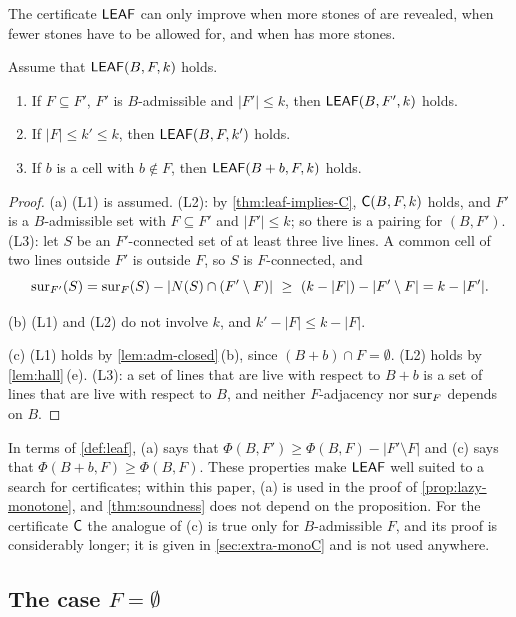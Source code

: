 The certificate $\mathsf{LEAF}$ can only improve when more stones of \Maker{} are revealed, when fewer stones
have to be allowed for, and when \Breaker{} has more stones.

\begin{proposition}\label{prop:leaf-monotone}
Assume that $\mathsf{LEAF}(B,F,k)$ holds.
\begin{enumerate}[label=\textup{(\alph*)}]
\item If $F\subseteq F'$, $F'$ is $B$-admissible and $|F'|\le k$, then $\mathsf{LEAF}(B,F',k)$ holds.
\item If $|F|\le k'\le k$, then $\mathsf{LEAF}(B,F,k')$ holds.
\item If $b$ is a cell with $b\notin F$, then $\mathsf{LEAF}(B+b,F,k)$ holds.
\end{enumerate}
\end{proposition}

\begin{proof}
(a) (L1) is assumed. (L2): by \cref{thm:leaf-implies-C}, $\mathsf{C}(B,F,k)$ holds, and $F'$ is a $B$-admissible
set with $F\subseteq F'$ and $|F'|\le k$; so there is a pairing for $(B,F')$. (L3): let $S$ be an
$F'$-connected set of at least three live lines. A common cell of two lines outside $F'$ is outside
$F$, so $S$ is $F$-connected, and
\[
  \operatorname{sur}_{F'}(S)=\operatorname{sur}_F(S)-|N(S)\cap(F'\setminus F)|\ \ge\ (k-|F|)-|F'\setminus F|=k-|F'| .
\]

(b) (L1) and (L2) do not involve $k$, and $k'-|F|\le k-|F|$.

(c) (L1) holds by \cref{lem:adm-closed}\,(b), since $(B+b)\cap F=\emptyset$. (L2) holds by
\cref{lem:hall}\,(e). (L3): a set of lines that are live with respect to $B+b$ is a set of lines that are
live with respect to $B$, and neither $F$-adjacency nor $\operatorname{sur}_F$ depends on $B$.
\end{proof}

In terms of \cref{def:leaf}, (a) says that $\Phi(B,F')\ge\Phi(B,F)-|F'\setminus F|$ and (c) says that
$\Phi(B+b,F)\ge\Phi(B,F)$. These properties make $\mathsf{LEAF}$ well suited to a search for certificates; within
this paper, (a) is used in the proof of \cref{prop:lazy-monotone}, and \cref{thm:soundness} does not
depend on the proposition. For the certificate $\mathsf{C}$ the analogue of (c) is true only for $B$-admissible
$F$, and its proof is considerably longer; it is given in \cref{sec:extra-monoC} and is not used
anywhere.

\subsection{The case \texorpdfstring{$F=\emptyset$}{F empty}}\label{ssec:Fempty}

